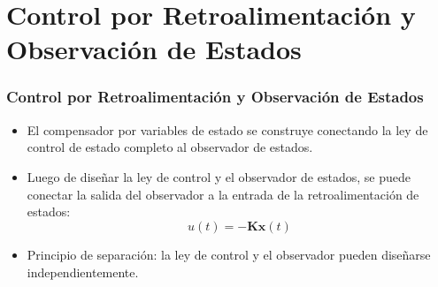 \documentclass[aspectratio=169]{beamer}
\theoremstyle{definition}
\theoremstyle{plain}
\theoremstyle{remark}
\begin{document}
\section{Control por Retroalimentación y Observación de Estados}
\begin{frame}[<+->]\frametitle{Control por Retroalimentación y Observación de Estados}
	\begin{itemize}
			\item El compensador por variables de estado se construye conectando la ley de control de estado completo al observador de estados.
			\item Luego de diseñar la ley de control y el observador de estados, se puede conectar la salida del observador a la entrada de la retroalimentación de estados:
			\begin{equation}
				u(t) = -\mathbf{K}\hat{\mathbf{x}}(t)
				\label{eq:controlLawObserver}
			\end{equation}
			\item Principio de separación: la ley de control y el observador pueden diseñarse independientemente.
		\end{itemize}	
\end{frame}
\end{document}
